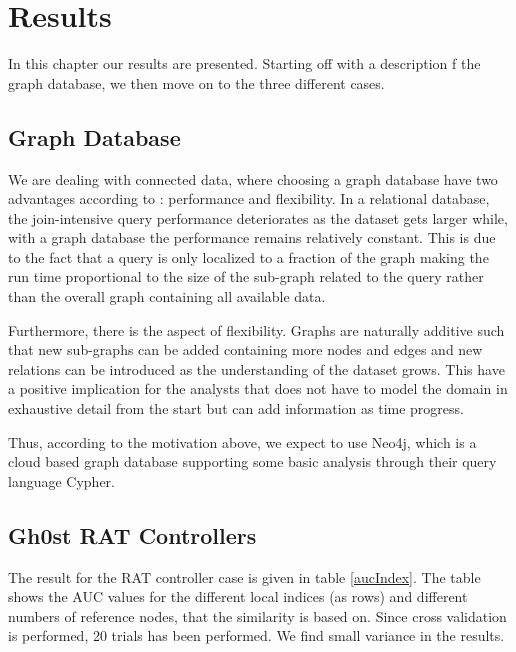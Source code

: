 \chapter{Results}
In this chapter our results are presented. Starting off with a description f the graph database, we then move on to the three different cases. 

\section{Graph Database}
We are dealing with connected data, where choosing a graph database have two advantages according to \citet{robinson2013}: performance and flexibility. In a relational database, the join-intensive query performance deteriorates as the dataset gets larger while, with a graph database the performance remains relatively constant. This is due to the fact that a query is only localized to a fraction of the graph making the run time proportional to the size of the sub-graph related to the query rather than the overall graph containing all available data.

Furthermore, there is the aspect of flexibility. Graphs are naturally additive \cite{robinson2013} such that new sub-graphs can be added containing more nodes and edges and new relations can be introduced as the understanding of the dataset grows. This have a positive implication for the analysts that does not have to model the domain in exhaustive detail from the start but can add information as time progress. 

Thus, according to the motivation above, we expect to use Neo4j, which is a cloud based graph database supporting some basic analysis through their query language Cypher.

\section{Gh0st RAT Controllers}
The result for the RAT controller case is given in table \ref{aucIndex}. The table shows the AUC values for the different local indices (as rows) and different numbers of reference nodes, that the similarity is based on. Since cross validation is performed, 20 trials has been performed. We find small variance in the results.

